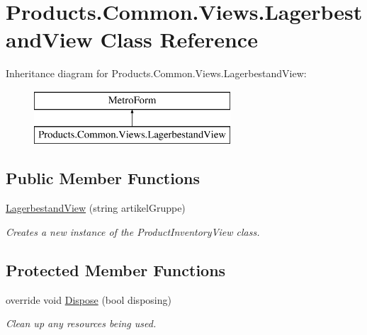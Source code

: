 \hypertarget{class_products_1_1_common_1_1_views_1_1_lagerbestand_view}{}\section{Products.\+Common.\+Views.\+Lagerbestand\+View Class Reference}
\label{class_products_1_1_common_1_1_views_1_1_lagerbestand_view}
Inheritance diagram for Products.\+Common.\+Views.\+Lagerbestand\+View\+:\begin{figure}[H]
\begin{center}
\leavevmode
\includegraphics[height=2.000000cm]{class_products_1_1_common_1_1_views_1_1_lagerbestand_view}
\end{center}
\end{figure}
\subsection*{Public Member Functions}
\begin{DoxyCompactItemize}
\item 
\hyperlink{class_products_1_1_common_1_1_views_1_1_lagerbestand_view_a30b0e7453c3461134be4e464f19b3564}{Lagerbestand\+View} (string artikel\+Gruppe)
\begin{DoxyCompactList}\small\item\em Creates a new instance of the Product\+Inventory\+View class. \end{DoxyCompactList}\end{DoxyCompactItemize}
\subsection*{Protected Member Functions}
\begin{DoxyCompactItemize}
\item 
override void \hyperlink{class_products_1_1_common_1_1_views_1_1_lagerbestand_view_a0c750b9f29d3630af9bea306693801a5}{Dispose} (bool disposing)
\begin{DoxyCompactList}\small\item\em Clean up any resources being used. \end{DoxyCompactList}\end{DoxyCompactItemize}


